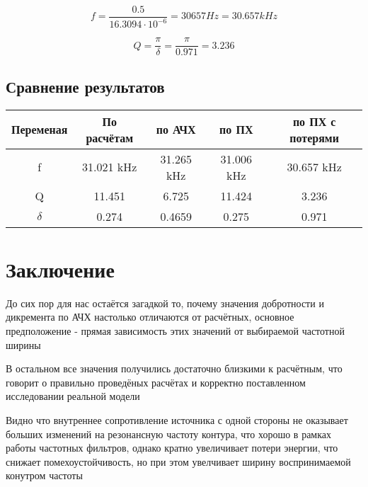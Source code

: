 \documentclass[12pt,a4paper]{article}
\begin{document}
			\[f = \frac{0.5}{16.3094 \cdot 10^{-6}} = 30657 Hz = 30.657 kHz\]
			
			\[Q = \frac{\pi}{\delta} = \frac{\pi}{0.971} = 3.236\]
			
		\subsection{Сравнение результатов}
		
		\centering
		\begin{tabular}{|c|c|c|c|c|}
			\hline
			Переменая & По расчётам & по АЧХ & по ПХ & по ПХ с потерями \\
			\hline
			f & 31.021 kHz & 31.265 kHz & 31.006 kHz & 30.657 kHz \\
 			\hline
			Q & 11.451 & 6.725 & 11.424 & 3.236 \\
			\hline
			$\delta$ & 0.274 & 0.4659 & 0.275 & 0.971 \\
			\hline
		\end{tabular}
		
		\newpage
		
		\section{Заключение}
		
		До сих пор для нас остаётся загадкой то, почему значения добротности и дикремента по АЧХ настолько отличаются от расчётных, основное предположение - прямая зависимость этих значений от выбираемой частотной ширины
		
		В остальном все значения получились достаточно близкими к расчётным, что говорит о правильно проведёных расчётах и корректно поставленном исследовании реальной модели
		
		Видно что внутреннее сопротивление источника с одной стороны не оказывает больших изменений на резонансную частоту контура, что хорошо в рамках работы частотных фильтров, однако кратно увеличивает потери энергии, что снижает помехоустойчивость, но при этом увелчивает ширину воспринимаемой конутром частоты
\end{document}
